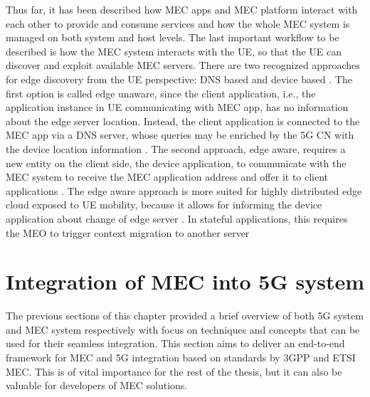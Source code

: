\documentclass[12pt,a4paper,twoside]{report}
\begin{document}
Thus far, it has been described how MEC apps and MEC platform interact with each other to provide and consume services and how the whole MEC system is managed on both system and host levels. The last important workflow to be described is how the MEC system interacts with the UE, so that the UE can discover and exploit available MEC servers.  There are two recognized approaches for edge discovery from the UE perspective: DNS based and device based \cite{ETSI:wp36}. The first option is called edge unaware, since the client application, i.e., the application instance in UE communicating with MEC app, has no information about the edge server location. Instead, the client application is connected to the MEC app via a DNS server, whose queries may be enriched by the 5G CN with the device location information \cite{ETSI:wp36,ETSI:wp20}. The second approach, edge aware, requires a new entity on the client side, the device application, to communicate with the MEC system to receive the MEC application address and offer it to client applications \cite{ETSI:wp20}. The edge aware approach is more suited for highly distributed edge cloud exposed to UE mobility, because it allows for informing the device application about change of edge server \cite{ETSI:wp36}. In stateful applications, this requires the MEO to trigger context migration to another server \cite{ETSI:GS:MEC003,ETSI:wp36}

\section{Integration of MEC into 5G system}
The previous sections of this chapter provided a brief overview of both 5G system and MEC system respectively with focus on techniques and concepts that can be used for their seamless integration. This section aims to deliver an end-to-end framework for MEC and 5G integration based on standards by 3GPP and ETSI MEC. This is of vital importance for the rest of the thesis, but it can also be valuable for developers of MEC solutions.
\end{document}
